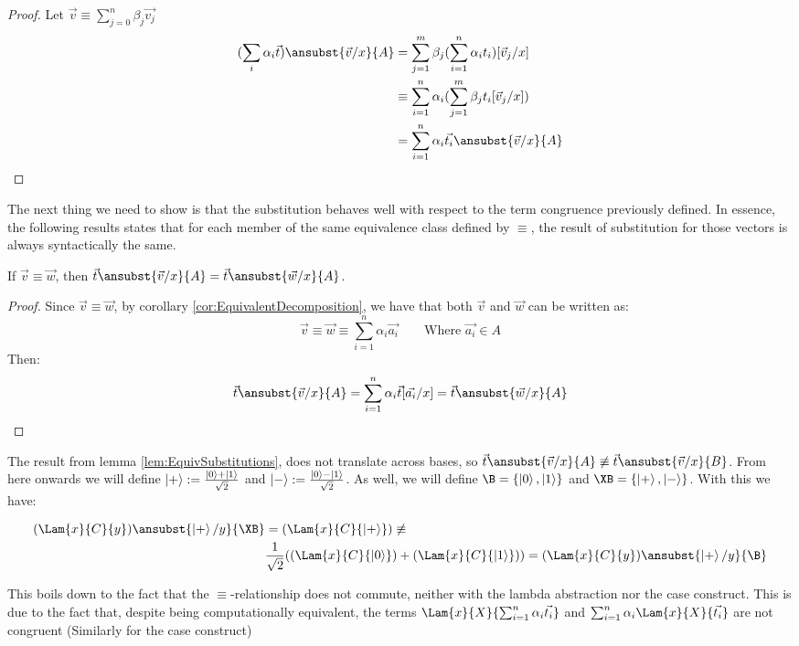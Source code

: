 \begin{proof}
  Let $\vec{v}\equiv\sum\limits_{j=0}^n \beta_j \vec{v_j}$
  \begin{align*}
    (\sum_i \alpha_i\vec t)\ansubst{\vec v/x}{A} &= \sum_{j=1}^m \beta_j(\sum_{i=1}^{n} \alpha_i t_i)[\vec v_j/x]\\
    &\equiv \sum_{i=1}^{n} \alpha_i (\sum_{j=1}^m \beta_j t_i [\vec v_j/x])\\
    &= \sum_{i=1}^{n} \alpha_i \vec{t_i}\ansubst{\vec v/x}{A}
  \end{align*}
\end{proof}

The next thing we need to show is that the substitution behaves well with respect to the term congruence previously defined. In essence, the following results states that for each member of the same equivalence class defined by $\equiv$, the result of substitution for those vectors is always syntactically the same.

\begin{lemma}\label{lem:EquivSubstitutions}
  If $\vec{v}\equiv\vec{w}$, then $\vec{t}\ansubst{\vec{v}/x}{A}=\vec{t}\ansubst{\vec{w}/x}{A}$.
\end{lemma}

\begin{proof}
  Since $\vec{v}\equiv\vec{w}$, by corollary \ref{cor:EquivalentDecomposition}, we have that both $\vec{v}$ and $\vec{w}$ can be written as:
  \[
  \vec{v} \equiv \vec{w} \equiv \sum_{i=1}^{n} \alpha_i \vec{a_i}\qquad\text{Where }\vec{a_i}\in A
  \]
  Then:
  \[
  \vec{t}\ansubst{\vec{v}/x}{A} = \sum_{i=1}^{n} \alpha_i \vec{t}[\vec{a_i}/x] = \vec{t}\ansubst{\vec{w}/x }{A}
  \]
\end{proof}

\begin{remark}
  The result from lemma \ref{lem:EquivSubstitutions}, does not translate across bases, so $\vec{t}\ansubst{\vec{v}/x}{A} \not\equiv \vec{t}\ansubst{\vec{v}/x}{B}$. From here onwards we will define $\left\vert{+}\right\rangle:=\frac{\left\vert{0}\right\rangle+\left\vert{1}\right\rangle}{\sqrt{2}}$ and $\left\vert{-}\right\rangle:=\frac{\left\vert{0}\right\rangle-\left\vert{1}\right\rangle}{\sqrt{2}}$. As well, we will define $\B = \{\ket{0}, \ket{1}\}$ and $\XB = \{\ket{+}, \ket{-}\}$. With this we have:
  
  \begin{align*}
    (\Lam{x}{C}{y})\ansubst{\ket{+}/y}{\XB} &= (\Lam{x}{C}{\ket{+}}) 
    \not\equiv \\ 
    &\frac{1}{\sqrt{2}} ((\Lam{x}{C}{\ket{0}}) + (\Lam{x}{C}{\ket{1}}))
    = (\Lam{x}{C}{y})\ansubst{\ket{+}/y}{\B}
  \end{align*}
  
  This boils down to the fact that the $\equiv$-relationship does not commute, neither with the lambda abstraction nor the case construct. This is due to the fact that, despite being computationally equivalent, the terms $\Lam{x}{X}{\sum_{i=1}^{n}\alpha_i \vec{t_i}}$ and $\sum_{i=1}^{n}\alpha_i \Lam{x}{X}{\vec{t_i}}$ are not congruent (Similarly for the case construct)
\end{remark}

